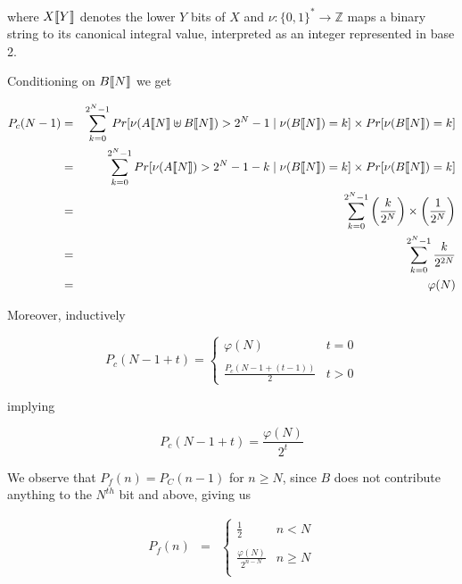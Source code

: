 where $X\llbracket Y \rrbracket $ denotes the lower $Y$ bits of $X$ and $\nu :
\{0, 1\}^* \to \mathbb{Z}$ maps a binary string to its canonical integral
value, interpreted as an integer represented in base 2.

Conditioning on $B\llbracket N \rrbracket $ we get

\begin{eqnarray*}
  \label{eq:approximation-before-N}
  P_c(N - 1) & = & \displaystyle\sum\limits_{k=0}^{2^{N} - 1}
  Pr[\nu(A\sembrack{N} \uplus B\sembrack{N}) > 2^N - 1 \mid \nu(B\sembrack{N}) = k]
  \times Pr[\nu(B\sembrack{N}) = k] \\
  & = & \displaystyle\sum\limits_{k=0}^{2^{N} - 1}
  Pr[\nu(A\sembrack{N}) > 2^N - 1 - k \mid \nu(B\sembrack{N}) = k]
  \times Pr[\nu(B\sembrack{N}) = k] \\
  & = & \displaystyle\sum\limits_{k=0}^{2^{N} - 1}
  \left(\frac{k}{2^N}\right) \times
  \left(\frac{1}{2^N}\right) \\
  & = & \displaystyle\sum\limits_{k=0}^{2^{N} - 1} \frac{k}{2^{2 N}} \\
  & = & \varphi(N)
\end{eqnarray*}

Moreover, inductively

\begin{equation}
  P_c(N - 1 + t) =
  \begin{cases}
    \varphi(N)  & t = 0 \\
    \\
    \frac{P_c(N - 1 + (t - 1))}{2} & t > 0
  \end{cases}
\end{equation}

implying

\begin{equation}
  P_c(N - 1 + t) = \frac{\varphi(N)}{2^t}
\end{equation}

We observe that $P_f(n) = P_C(n - 1)$ for $n \geq N$, since $B$ does
not contribute anything to the $N^{th}$ bit and above, giving us


\begin{eqnarray*}
  P_f(n) & = &
  \begin{cases}
    \frac{1}{2} & n < N \\
    \\
    \frac{\varphi(N)}{2^{n - N}} & n \geq N \\
  \end{cases} \\
\end{eqnarray*}


